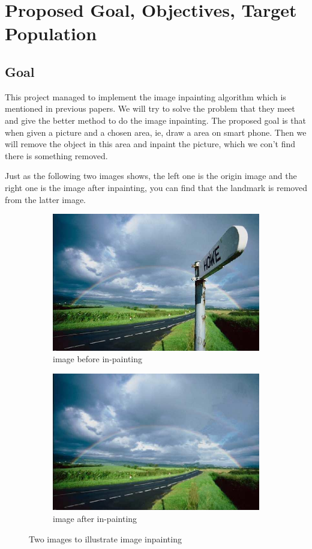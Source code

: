 \documentclass[12pt]{article}
\begin{document}
\section{Proposed Goal, Objectives, Target Population}
\subsection{Goal}
\qquad This project managed to implement the image inpainting algorithm which is mentioned in previous papers. We will try to solve the problem that they meet and give the better method to do the image inpainting. The proposed goal is that when given a picture and a chosen area, ie, draw a area on smart phone. Then we will remove the object in this area and inpaint the picture, which we con't find there is something removed.

\qquad Just as the following two images shows, the left one is the origin image and the right one is the image after inpainting, you can find that the landmark is removed from the latter image.

\begin{figure}[H]
	\begin{subfigure}[pos]{.5\textwidth}
		\centering
		\includegraphics*[width=0.8\linewidth]{1.jpg}
		\caption{image before in-painting}
	\end{subfigure}%
	\begin{subfigure}[pos]{.5\textwidth}
		\centering
		\includegraphics*[width=0.8\linewidth]{2.jpg}
		\caption{image after in-painting}
	\end{subfigure}%
	\caption{Two images to illustrate image inpainting}
\end{figure}
 
\end{document}
